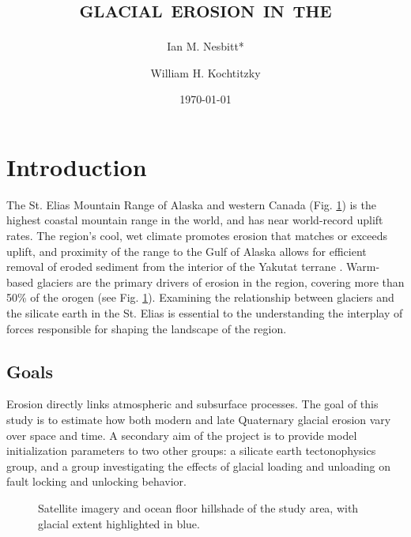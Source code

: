 \documentclass[twocolumn]{aastex6}
\begin{document}
	
	
	\title{\textsc{\lowercase{ glacial erosion in the }}}
	\author{Ian M. Nesbitt*}
	\author{William H. Kochtitzky}
	\date{\today}

	\maketitle


	\section{Introduction}
		The St. Elias Mountain Range of Alaska and western Canada (Fig. \ref{f:location}) is the highest coastal mountain range in the world, and has near world-record uplift rates. The region's cool, wet climate promotes erosion that matches or exceeds uplift, and proximity of the range to the Gulf of Alaska allows for efficient removal of eroded sediment from the interior of the Yakutat terrane \citep{Enkelmann2015,Gulick2015}. Warm-based glaciers are the primary drivers of erosion in the region, covering more than 50\% of the orogen (see Fig. \ref{f:location}). Examining the relationship between glaciers and the silicate earth in the St. Elias is essential to the understanding the interplay of forces responsible for shaping the landscape of the region.
		
	\subsection{Goals}
		Erosion directly links atmospheric and subsurface processes. The goal of this study is to estimate how both modern and late Quaternary glacial erosion vary over space and time. A secondary aim of the project is to provide model initialization parameters to two other groups: a silicate earth tectonophysics group, and a group investigating the effects of glacial loading and unloading on fault locking and unlocking behavior.

		\begin{figure}[t]
			\centering
			\caption{\label{f:location} Satellite imagery and ocean floor hillshade of the study area, with glacial extent highlighted in blue.}
		\end{figure}
\end{document}
